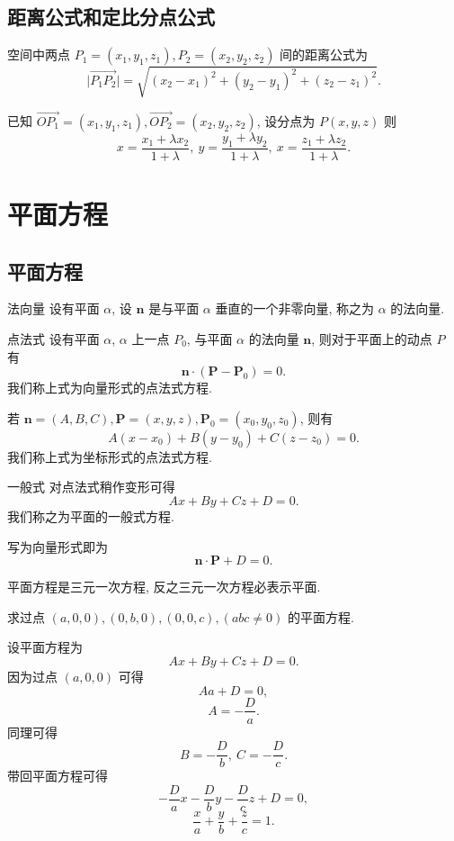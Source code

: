\documentclass[cn,toc=twocol]{elegantbook}
\newcommand{\ve}[1]{\boldsymbol{#1}}
\newcommand{\Ve}[1]{\overrightarrow{#1}}
\begin{document}
\subsection{距离公式和定比分点公式}

空间中两点 $P_1 = (x_1, y_1, z_1), P_2 = (x_2, y_2, z_2)$ 间的距离公式为
\[
	\lvert \Ve{P_1 P_2} \rvert = \sqrt{(x_2 - x_1)^2 + (y_2 - y_1)^2 + (z_2 - z_1)^2}.
\]

已知 $\Ve{OP_1} = (x_1, y_1, z_1), \Ve{OP_2} = (x_2, y_2, z_2)$, 设分点为 $P(x, y, z)$ 则
\[
	x = \frac{x_1 + \lambda x_2}{1+\lambda},\ y = \frac{y_1 + \lambda y_2}{1+\lambda},\ x = \frac{z_1 + \lambda z_2}{1+\lambda}.
\]

\section{平面方程}
\subsection{平面方程}

\begin{definition}{法向量}
	设有平面 $\alpha$, 设 $\ve n$ 是与平面 $\alpha$ 垂直的一个非零向量, 称之为 $\alpha$ 的法向量.
\end{definition}

\begin{proposition}{点法式}
	设有平面 $\alpha$, $\alpha$ 上一点 $P_0$, 与平面 $\alpha$ 的法向量 $\ve n$, 则对于平面上的动点 $P$ 有
	\[
		\ve n \cdot (\ve P - \ve P_0) = 0.
	\]
	我们称上式为向量形式的点法式方程.
	
	若 $\ve n = (A, B, C), \ve P = (x, y, z), \ve P_0 = (x_0, y_0, z_0)$, 则有
	\[
		A (x - x_0) + B (y - y_0) + C (z - z_0) = 0.
	\]
	我们称上式为坐标形式的点法式方程.
\end{proposition}

\begin{proposition}{一般式}
	对点法式稍作变形可得
	\[
		A x + B y + C z + D = 0.
	\]
	我们称之为平面的一般式方程.
	
	写为向量形式即为
	\[
		\ve n \cdot \ve P + D = 0.
	\]
\end{proposition}

\begin{theorem}
	平面方程是三元一次方程, 反之三元一次方程必表示平面.
\end{theorem}


\begin{example}
	求过点 $(a, 0, 0), (0, b, 0), (0, 0, c), (abc \neq 0)$ 的平面方程.
\end{example}
\begin{solution}
	设平面方程为
	\[
		A x + B y + C z + D = 0.
	\]
	因为过点 $(a, 0, 0)$ 可得
	\[
		A a + D = 0,
	\]
	\[
		A = -\frac{D}{a}.
	\]
	同理可得
	\[
		B = -\frac{D}{b},\ C = -\frac{D}{c}.
	\]
	带回平面方程可得
	\[
		-\frac{D}{a} x - \frac{D}{b} y - \frac{D}{c} z + D = 0,
	\]
	\[
		\frac{x}{a} + \frac{y}{b} + \frac{z}{c} = 1.
	\]
\end{solution}
\end{document}
